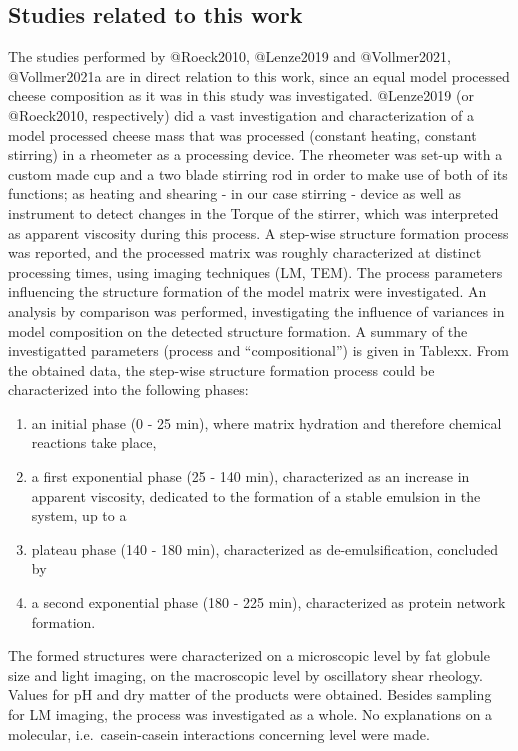 \documentclass[
]{article}
\providecommand{\tightlist}{%
  \setlength{\itemsep}{0pt}\setlength{\parskip}{0pt}}
\begin{document}
\subsection{Studies related to this work}

The studies performed by @Roeck2010, @Lenze2019 and @Vollmer2021,
@Vollmer2021a are in direct relation to this work, since an equal model
processed cheese composition as it was in this study was investigated.
@Lenze2019 (or @Roeck2010, respectively) did a vast investigation and
characterization of a model processed cheese mass that was processed
(constant heating, constant stirring) in a rheometer as a processing
device. The rheometer was set-up with a custom made cup and a two blade
stirring rod in order to make use of both of its functions; as heating
and shearing - in our case stirring - device as well as instrument to
detect changes in the Torque of the stirrer, which was interpreted as
apparent viscosity during this process. A step-wise structure formation
process was reported, and the processed matrix was roughly characterized
at distinct processing times, using imaging techniques (LM, TEM). The
process parameters influencing the structure formation of the model
matrix were investigated. An analysis by comparison was performed,
investigating the influence of variances in model composition on the
detected structure formation. A summary of the investigatted parameters
(process and ``compositional'') is given in Tablexx. From the obtained
data, the step-wise structure formation process could be characterized
into the following phases:

\begin{enumerate}
\def\labelenumi{(\alph{enumi})}
\tightlist
\item
  an initial phase (0 - 25 min), where matrix hydration and therefore
  chemical reactions take place,
\item
  a first exponential phase (25 - 140 min), characterized as an increase
  in apparent viscosity, dedicated to the formation of a stable emulsion
  in the system, up to a\\
\item
  plateau phase (140 - 180 min), characterized as de-emulsification,
  concluded by
\item
  a second exponential phase (180 - 225 min), characterized as protein
  network formation.
\end{enumerate}

The formed structures were characterized on a microscopic level by fat
globule size and light imaging, on the macroscopic level by oscillatory
shear rheology. Values for pH and dry matter of the products were
obtained. Besides sampling for LM imaging, the process was investigated
as a whole. No explanations on a molecular, i.e.~casein-casein
interactions concerning level were made.
\end{document}
